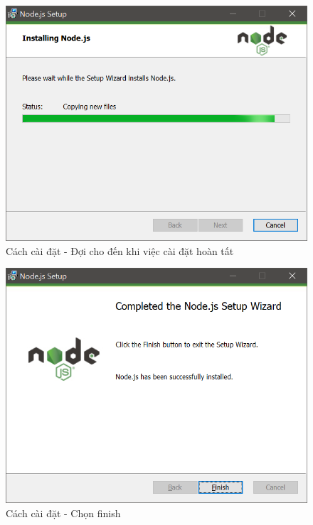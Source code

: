 \documentclass{report}
\begin{document}
\begin{center}
    \begin{figure}[htp]
    \begin{center}
     \includegraphics[scale=0.9]{install6.png}
    \end{center}
    \caption{Cách cài đặt - Đợi cho đến khi việc cài đặt hoàn tất}
    \label{refhinh1}
    \end{figure}
\end{center}

\begin{center}
    \begin{figure}[htp]
    \begin{center}
     \includegraphics[scale=0.9]{install7.png}
    \end{center}
    \caption{Cách cài đặt - Chọn finish}
    \label{refhinh1}
    \end{figure}
\end{center}
\end{document}
